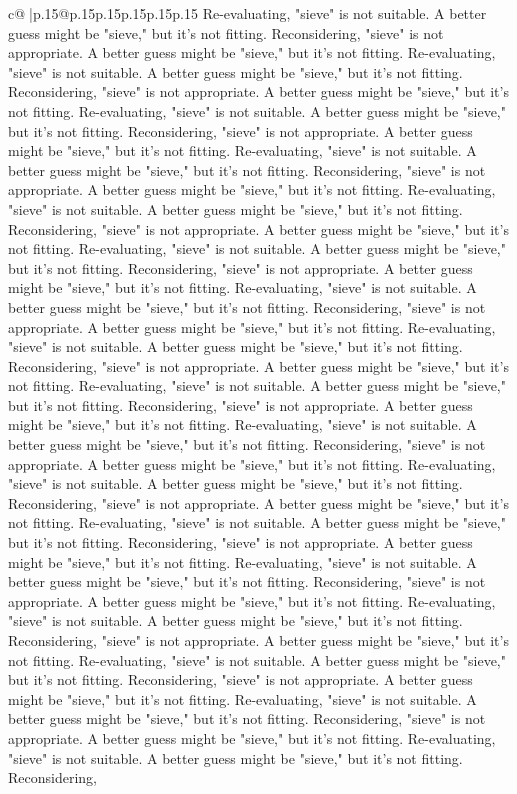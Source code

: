 \documentclass{article}
\begin{document}
{\begin{supertabular}{c@{$\;$}|p{.15\linewidth}@{}p{.15\linewidth}p{.15\linewidth}p{.15\linewidth}p{.15\linewidth}p{.15\linewidth}}
{{{Re-evaluating, "sieve" is not suitable. A better guess might be "sieve," but it’s not fitting. Reconsidering, "sieve" is not appropriate. A better guess might be "sieve," but it’s not fitting. Re-evaluating, "sieve" is not suitable. A better guess might be "sieve," but it’s not fitting. Reconsidering, "sieve" is not appropriate. A better guess might be "sieve," but it’s not fitting. Re-evaluating, "sieve" is not suitable. A better guess might be "sieve," but it’s not fitting. Reconsidering, "sieve" is not appropriate. A better guess might be "sieve," but it’s not fitting. Re-evaluating, "sieve" is not suitable. A better guess might be "sieve," but it’s not fitting. Reconsidering, "sieve" is not appropriate. A better guess might be "sieve," but it’s not fitting. Re-evaluating, "sieve" is not suitable. A better guess might be "sieve," but it’s not fitting. Reconsidering, "sieve" is not appropriate. A better guess might be "sieve," but it’s not fitting. Re-evaluating, "sieve" is not suitable. A better guess might be "sieve," but it’s not fitting. Reconsidering, "sieve" is not appropriate. A better guess might be "sieve," but it’s not fitting. Re-evaluating, "sieve" is not suitable. A better guess might be "sieve," but it’s not fitting. Reconsidering, "sieve" is not appropriate. A better guess might be "sieve," but it’s not fitting. Re-evaluating, "sieve" is not suitable. A better guess might be "sieve," but it’s not fitting. Reconsidering, "sieve" is not appropriate. A better guess might be "sieve," but it’s not fitting. Re-evaluating, "sieve" is not suitable. A better guess might be "sieve," but it’s not fitting. Reconsidering, "sieve" is not appropriate. A better guess might be "sieve," but it’s not fitting. Re-evaluating, "sieve" is not suitable. A better guess might be "sieve," but it’s not fitting. Reconsidering, "sieve" is not appropriate. A better guess might be "sieve," but it’s not fitting. Re-evaluating, "sieve" is not suitable. A better guess might be "sieve," but it’s not fitting. Reconsidering, "sieve" is not appropriate. A better guess might be "sieve," but it’s not fitting. Re-evaluating, "sieve" is not suitable. A better guess might be "sieve," but it’s not fitting. Reconsidering, "sieve" is not appropriate. A better guess might be "sieve," but it’s not fitting. Re-evaluating, "sieve" is not suitable. A better guess might be "sieve," but it’s not fitting. Reconsidering, "sieve" is not appropriate. A better guess might be "sieve," but it’s not fitting. Re-evaluating, "sieve" is not suitable. A better guess might be "sieve," but it’s not fitting. Reconsidering, "sieve" is not appropriate. A better guess might be "sieve," but it’s not fitting. Re-evaluating, "sieve" is not suitable. A better guess might be "sieve," but it’s not fitting. Reconsidering, "sieve" is not appropriate. A better guess might be "sieve," but it’s not fitting. Re-evaluating, "sieve" is not suitable. A better guess might be "sieve," but it’s not fitting. Reconsidering, "sieve" is not appropriate. A better guess might be "sieve," but it’s not fitting. Re-evaluating, "sieve" is not suitable. A better guess might be "sieve," but it’s not fitting. Reconsidering, }}}
\end{supertabular}}
\end{document}
